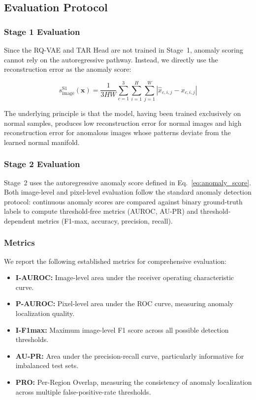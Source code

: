 \documentclass[lettersize,journal]{IEEEtran}
\begin{document}
\subsection{Evaluation Protocol}

\subsubsection{Stage 1 Evaluation}

Since the RQ-VAE and TAR Head are not trained in Stage~1, anomaly scoring cannot rely on the autoregressive pathway. Instead, we directly use the reconstruction error as the anomaly score:

\begin{equation}
\label{eq:eval_stage1}
s_{\text{image}}^{\text{S1}}(\mathbf{x}) = \frac{1}{3HW} \sum_{c=1}^{3} \sum_{i=1}^{H} \sum_{j=1}^{W} |\hat{x}_{c,i,j} - x_{c,i,j}|
\end{equation}

The underlying principle is that the model, having been trained exclusively on normal samples, produces low reconstruction error for normal images and high reconstruction error for anomalous images whose patterns deviate from the learned normal manifold.

\subsubsection{Stage 2 Evaluation}

Stage~2 uses the autoregressive anomaly score defined in Eq.~\ref{eq:anomaly_score}. Both image-level and pixel-level evaluation follow the standard anomaly detection protocol: continuous anomaly scores are compared against binary ground-truth labels to compute threshold-free metrics (AUROC, AU-PR) and threshold-dependent metrics (F1-max, accuracy, precision, recall).

\subsubsection{Metrics}

We report the following established metrics for comprehensive evaluation:

\begin{itemize}
\item \textbf{I-AUROC:} Image-level area under the receiver operating characteristic curve.
\item \textbf{P-AUROC:} Pixel-level area under the ROC curve, measuring anomaly localization quality.
\item \textbf{I-F1max:} Maximum image-level F1 score across all possible detection thresholds.
\item \textbf{AU-PR:} Area under the precision-recall curve, particularly informative for imbalanced test sets.
\item \textbf{PRO:} Per-Region Overlap, measuring the consistency of anomaly localization across multiple false-positive-rate thresholds.
\end{itemize}
\end{document}
